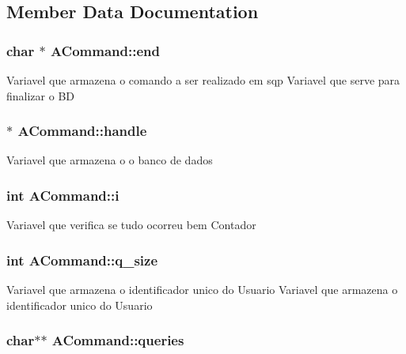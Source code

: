 \subsection{Member Data Documentation}
\hypertarget{class_a_command_ac36454f9da108ff845c6303c8d7f70ae}{
\subsubsection[{end}]{\setlength{\rightskip}{0pt plus 5cm}char $\ast$ A\-Command\-::end\hspace{0.3cm}{\ttfamily [protected]}}}\label{class_a_command_ac36454f9da108ff845c6303c8d7f70ae}
Variavel que armazena o comando a ser realizado em sqp Variavel que serve para finalizar o B\-D \hypertarget{class_a_command_a6f48bd41253cbcc5e766c222776e4931}{
\subsubsection[{handle}]{$\ast$ A\-Command\-::handle\hspace{0.3cm}{\ttfamily [protected]}}}\label{class_a_command_a6f48bd41253cbcc5e766c222776e4931}
Variavel que armazena o o banco de dados \hypertarget{class_a_command_aa011a4976cefd5da8bd7e8231809f19d}{
\subsubsection[{i}]{\setlength{\rightskip}{0pt plus 5cm}int A\-Command\-::i\hspace{0.3cm}{\ttfamily [protected]}}}\label{class_a_command_aa011a4976cefd5da8bd7e8231809f19d}
Variavel que verifica se tudo ocorreu bem Contador \hypertarget{class_a_command_a769e24f33dec6fbffac667052257d575}{
\subsubsection[{q\-\_\-size}]{\setlength{\rightskip}{0pt plus 5cm}int A\-Command\-::q\-\_\-size\hspace{0.3cm}{\ttfamily [protected]}}}\label{class_a_command_a769e24f33dec6fbffac667052257d575}
Variavel que armazena o identificador unico do Usuario Variavel que armazena o identificador unico do Usuario \hypertarget{class_a_command_a6a34b07a8ab76688ad3a60bfba71c03a}{
\subsubsection[{queries}]{\setlength{\rightskip}{0pt plus 5cm}char$\ast$$\ast$ A\-Command\-::queries\hspace{0.3cm}{\ttfamily [protected]}}}\label{class_a_command_a6a34b07a8ab76688ad3a60bfba71c03a}
